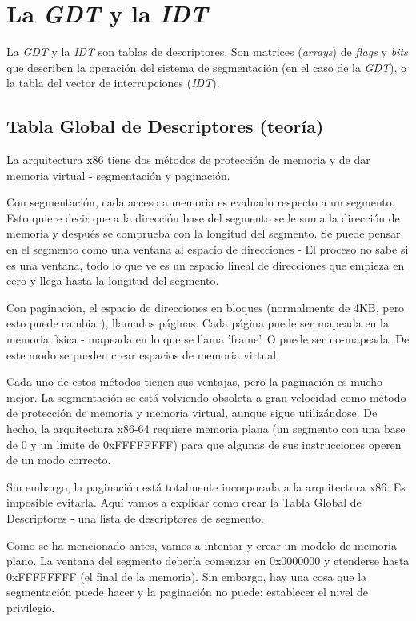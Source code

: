\documentclass{report}
\begin{document}
\chapter{La \textit{GDT} y la \textit{IDT}}

La \textit{GDT} y la \textit{IDT} son tablas de descriptores.
Son matrices (\textit{arrays}) de \textit{flags} y \textit{bits} que describen la operación del sistema
de segmentación (en el caso de la \textit{GDT}), o la tabla del vector de interrupciones (\textit{IDT}).

\section{Tabla Global de Descriptores (teoría)}

La arquitectura x86 tiene dos métodos de protección de memoria y de dar memoria virtual - segmentación y paginación.

Con segmentación, cada acceso a memoria es evaluado respecto a un segmento. Esto quiere decir que a la dirección base del segmento se le suma la dirección de memoria y después se comprueba con la longitud del segmento. Se puede pensar en el segmento como una ventana al espacio de direcciones - El proceso no sabe si es una ventana, todo lo que ve es un espacio lineal de direcciones que empieza en cero y llega hasta la longitud del segmento.

Con paginación, el espacio de direcciones en bloques (normalmente de 4KB, pero esto puede cambiar), llamados páginas. Cada página puede ser mapeada en la memoria física - mapeada en lo que se llama 'frame'. O puede ser no-mapeada. De este modo se pueden crear espacios de memoria virtual.

Cada uno de estos métodos tienen sus ventajas, pero la paginación es mucho mejor. La segmentación se está volviendo obsoleta a gran velocidad como método de protección de memoria y memoria virtual, aunque sigue utilizándose. De hecho, la arquitectura x86-64 requiere memoria plana (un segmento con una base de 0 y un límite de 0xFFFFFFFF) para que algunas de sus instrucciones operen de un modo correcto.

Sin embargo, la paginación está totalmente incorporada a la arquitectura x86. Es imposible evitarla. Aquí vamos a explicar como crear la Tabla Global de Descriptores - una lista de descriptores de segmento.

Como se ha mencionado antes, vamos a intentar y crear un modelo de memoria plano. La ventana del segmento debería comenzar en 0x0000000 y etenderse hasta 0xFFFFFFFF (el final de la memoria). Sin embargo, hay una cosa que la segmentación puede hacer y la paginación no puede: establecer el nivel de privilegio.
\end{document}
